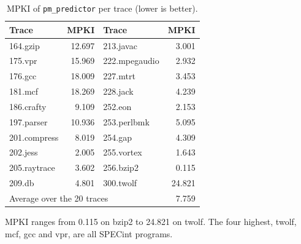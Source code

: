 \documentclass[11pt]{article}
\newcommand{\code}[1]{\texttt{#1}}
\begin{document}
\begin{table}[htbp]
\centering
\caption{MPKI of \code{pm\_predictor} per trace (lower is better).}
\label{tab:mpki}
\begin{tabular}{lr@{\hspace{3em}}lr}
\toprule
Trace & MPKI & Trace & MPKI \\
\midrule
164.gzip & 12.697 & 213.javac & 3.001 \\
175.vpr & 15.969 & 222.mpegaudio & 2.932 \\
176.gcc & 18.009 & 227.mtrt & 3.453 \\
181.mcf & 18.269 & 228.jack & 4.239 \\
186.crafty & 9.109 & 252.eon & 2.153 \\
197.parser & 10.936 & 253.perlbmk & 5.095 \\
201.compress & 8.019 & 254.gap & 4.309 \\
202.jess & 2.005 & 255.vortex & 1.643 \\
205.raytrace & 3.602 & 256.bzip2 & 0.115 \\
209.db & 4.801 & 300.twolf & 24.821 \\
\midrule
\multicolumn{3}{l}{Average over the 20 traces} & 7.759 \\
\bottomrule
\end{tabular}
\end{table}

MPKI ranges from 0.115 on bzip2 to 24.821 on twolf. The four highest, twolf, mcf, gcc and vpr,
are all SPECint programs.



\end{document}
